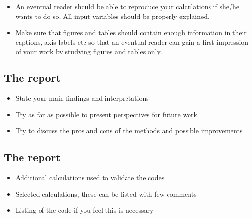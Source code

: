 \documentclass[%
twoside,                 %
final,                   %
10pt]{article}
\newenvironment{block_mdfboxadmon}[1][]{
\begin{block_mdfboxmdframed}[frametitle=#1]
}
{
\end{block_mdfboxmdframed}
}
\begin{document}
{{{{{{{{{\begin{block_mdfboxadmon}
\begin{itemize}
 \item An eventual reader should be able to reproduce your calculations if she/he wants to do so. All input variables should be properly explained.

 \item Make sure that figures and tables should contain enough information in their captions, axis labels etc so that an eventual reader can gain a first impression of your work by studying figures and tables only.
\end{itemize}

\noindent
\end{block_mdfboxadmon}




\subsection{The report}

\begin{block_mdfboxadmon}
\begin{itemize}
 \item State your main findings and interpretations

 \item Try as far as possible to present perspectives for future work

 \item Try to discuss the pros and cons of the methods and possible improvements
\end{itemize}

\noindent
\end{block_mdfboxadmon}



\subsection{The report}

\begin{block_mdfboxadmon}
\begin{itemize}
 \item Additional calculations used to validate the codes

 \item Selected calculations, these can be listed with  few comments

 \item Listing of the code if you feel this is necessary
\end{itemize}


\end{block_mdfboxadmon}}}}}}}}}}
\end{document}

